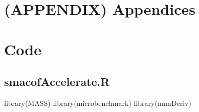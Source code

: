 \documentclass[
  12pt,
  letterpaper,
  DIV=11,
  numbers=noendperiod]{scrartcl}
\newenvironment{Shaded}{\begin{snugshade}}{\end{snugshade}}
\newcommand{\FunctionTok}[1]{\textcolor[rgb]{0.28,0.35,0.67}{#1}}
\newcommand{\NormalTok}[1]{\textcolor[rgb]{0.00,0.23,0.31}{#1}}
\begin{document}
\section*{(APPENDIX) Appendices}\label{appendix-appendices}

\section{Code}\label{code}

\subsection{smacofAccelerate.R}\label{smacofaccelerate.r}

\begin{Shaded}
\begin{Highlighting}[]
\FunctionTok{library}\NormalTok{(MASS)}
\FunctionTok{library}\NormalTok{(microbenchmark)}
\FunctionTok{library}\NormalTok{(numDeriv)}


\end{Highlighting}
\end{Shaded}
\end{document}
